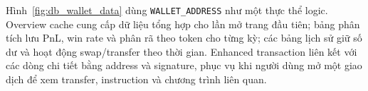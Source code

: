 Hình~\ref{fig:db_wallet_data} dùng \texttt{WALLET\_ADDRESS} như một thực thể logic. Overview cache cung cấp dữ liệu tổng hợp cho lần mở trang đầu tiên; bảng phân tích lưu PnL, win rate và phân rã theo token cho từng kỳ; các bảng lịch sử giữ số dư và hoạt động swap/transfer theo thời gian. Enhanced transaction liên kết với các dòng chi tiết bằng address và signature, phục vụ khi người dùng mở một giao dịch để xem transfer, instruction và chương trình liên quan.

